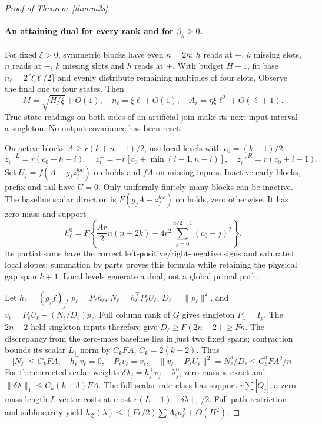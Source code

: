 \documentclass[11pt]{article}
\begin{document}
\begin{proof}[Proof of Theorem~\ref{thm:m2s}]
\paragraph{An attaining dual for every rank and for $\beta_k\ge0$.}
For fixed $\xi>0$, symmetric blocks have even $n=2h$:
$h$ reads at $+$, $k$ missing slots, $n$ reads at $-$,
$k$ missing slots and $h$ reads at $+$.
With budget $H-1$, fit base $n_\ell=2\lceil\xi\ell/2\rceil$ and evenly distribute
remaining multiples of four slots. Observe the final one to four states.
Then
\[
M=\sqrt{H/\xi}+O(1),\quad n_\ell=\xi\ell+O(1),\quad
A_\ell=\eta\xi\ell^2+O(\ell+1).
\]
True state readings on both sides of an artificial join make its next input
interval a singleton. No output covariance has been reset.

On active blocks $A\ge r(k+n-1)/2$, use local levels with $c_0=(k+1)/2$:
\[
z_i^{+,L}=r(c_0+h-i),\quad
z_i^-=-r[c_0+\min(i-1,n-i)],\quad
z_i^{+,R}=r(c_0+i-1).
\]
Set $U_j=f(A-g_jz_j^{loc})$ on holds and $fA$ on missing inputs.
Inactive early blocks, prefix and tail have $U=0$.
Only uniformly finitely many blocks can be inactive.
The baseline scalar direction is $F(g_jA-z_j^{loc})$ on holds, zero otherwise.
It has zero mass and support
\[
h_\ell^0=F\left\{\frac{Ar}{2}n(n+2k)
-4r^2\sum_{j=0}^{n/2-1}(c_0+j)^2\right\}.
\]
Its partial sums have the correct left-positive/right-negative signs
and saturated local slopes; summation by parts proves this formula while
retaining the physical gap span $k+1$.
Local levels generate a dual, not a global primal path.

Let $h_\ell=(g_jf)_j$, $p_\ell=P_\ell h_\ell$,
$N_\ell=h_\ell^\top P_\ell U_\ell$,
$D_\ell=\|p_\ell\|^2$, and
$v_\ell=P_\ell U_\ell-(N_\ell/D_\ell)p_\ell$.
Full column rank of $G$ gives singleton $P_1=I_p$.
The $2n-2$ held singleton inputs therefore give $D_\ell\ge F(2n-2)\ge Fn$.
The discrepancy from the zero-mass baseline lies in just two fixed spans;
contraction bounds its scalar $L_1$ norm by $C_kFA$, $C_k=2(k+2)$.
Thus
\[
|N_\ell|\le C_kFA,\quad
h_\ell^\top v_\ell=0,\quad P_\ell v_\ell=v_\ell,\quad
\|v_\ell-P_\ell U_\ell\|^2=N_\ell^2/D_\ell\le C_k^2FA^2/n .
\]
For the corrected scalar weights
$\delta\lambda_j=h_j^\top v_j-\lambda_j^0$,
zero mass is exact and $\|\delta\lambda\|_1\le C_k(k+3)FA$.
The full scalar rate class has support $r\sum|Q_j|$;
a zero-mass length-$L$ vector costs at most $r(L-1)\|\delta\lambda\|_1/2$.
Full-path restriction and sublinearity yield
$h_{\mathcal Z}(\lambda)\le(Fr/2)\sum A_\ell n_\ell^2+O(H^2)$.


\end{proof}
\end{document}
